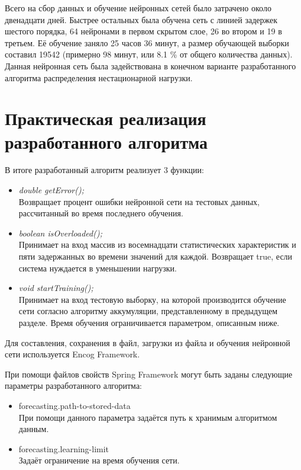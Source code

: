 \documentclass[a4paper,14pt,russian]{extreport}
\newcommand{\url}[1]{#1}
\begin{document}
Всего на сбор данных и обучение нейронных сетей было затрачено около 
двенадцати дней. Быстрее остальных была обучена сеть с линией задержек 
шестого порядка, 64 нейронами в первом скрытом слое, 26 во втором и 19 в 
третьем. Её обучение заняло 25 часов 36 минут, а размер обучающей выборки 
составил 19542 (примерно 98 минут, или 8.1 \% от общего количества данных). 
Данная нейронная сеть была задействована в конечном варианте 
разработанного алгоритма распределения нестационарной нагрузки.

\section{Практическая реализация разработанного алгоритма}
В итоге разработанный алгоритм реализует 3 функции:
\begin{itemize}
	\item {\itshape double getError();}  \\
		Возвращает процент ошибки нейронной сети на тестовых данных, 
		рассчитанный во время последнего обучения.
	\item {\itshape boolean isOverloaded();}  \\
		Принимает на вход массив из восемнадцати статистических 
		характеристик и пяти задержанных во времени значений для каждой. 
		Возвращает true, если система нуждается в уменьшении нагрузки.
	\item {\itshape void startTraining();} \\ 
		Принимает на вход тестовую выборку, на которой производится 
		обучение сети согласно алгоритму аккумуляции, представленному в 
		предыдущем разделе. Время обучения ограничивается параметром, 
		описанным ниже.
\end{itemize}

Для составления, сохранения в файл, загрузки из файла и обучения нейронной 
сети используется Encog Framework.

При помощи файлов свойств Spring Framework могут быть заданы следующие 
параметры разработанного алгоритма:
\begin{itemize}
	\item \url{forecasting.path-to-stored-data} \\ 
		При помощи данного параметра задаётся путь к хранимым алгоритмом 
		данным.
	\item \url{forecasting.learning-limit} \\ 
		Задаёт ограничение на время обучения сети.
\end{itemize}
\end{document}
